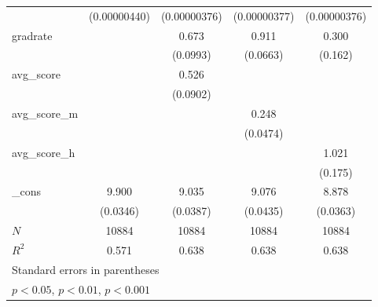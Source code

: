 {\begin{tabular}{l*{4}{c}}
            &(0.00000440)         &(0.00000376)         &(0.00000377)         &(0.00000376)         \\
[1em]
gradrate    &                     &       0.673\sym{***}&       0.911\sym{***}&       0.300         \\
            &                     &    (0.0993)         &    (0.0663)         &     (0.162)         \\
[1em]
avg\_score   &                     &       0.526\sym{***}&                     &                     \\
            &                     &    (0.0902)         &                     &                     \\
[1em]
avg\_score\_m &                     &                     &       0.248\sym{***}&                     \\
            &                     &                     &    (0.0474)         &                     \\
[1em]
avg\_score\_h &                     &                     &                     &       1.021\sym{***}\\
            &                     &                     &                     &     (0.175)         \\
[1em]
\_cons      &       9.900\sym{***}&       9.035\sym{***}&       9.076\sym{***}&       8.878\sym{***}\\
            &    (0.0346)         &    (0.0387)         &    (0.0435)         &    (0.0363)         \\
\hline
\(N\)       &       10884         &       10884         &       10884         &       10884         \\
\(R^{2}\)   &       0.571         &       0.638         &       0.638         &       0.638         \\
\hline\hline
\multicolumn{5}{l}{\footnotesize Standard errors in parentheses}\\
\multicolumn{5}{l}{\footnotesize \sym{*} \(p<0.05\), \sym{**} \(p<0.01\), \sym{***} \(p<0.001\)}\\
\end{tabular}
}
